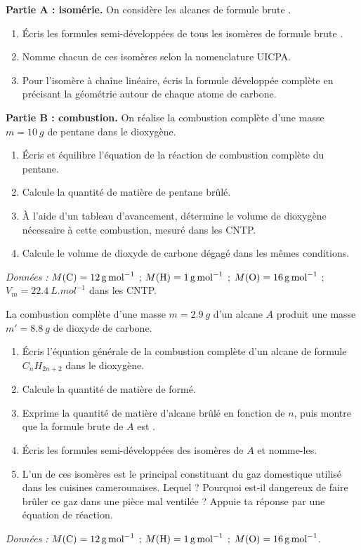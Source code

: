 \documentclass[11pt]{article}
\newcounter{popsec}
\newcounter{popsub}
\newcommand{\courssub}[1]{%
  \stepcounter{popsub}%
  \par\vspace{9pt}\noindent{\popxbold\fontsize{11.5}{13}\selectfont\color{popink}{\color{poporange}\thepopsec.\thepopsub}\hspace{6pt}#1}\par\nopagebreak\vspace{4pt}
}
\begin{document}
\courssub{Je me prépare au Probatoire}

\begin{exercice}
\textbf{Partie A : isomérie.} On considère les alcanes de formule brute .
\begin{enumerate}
\item Écris les formules semi-développées de tous les isomères de formule brute .
\item Nomme chacun de ces isomères selon la nomenclature UICPA.
\item Pour l'isomère à chaîne linéaire, écris la formule développée complète en précisant la géométrie autour de chaque atome de carbone.
\end{enumerate}
\textbf{Partie B : combustion.} On réalise la combustion complète d'une masse $m = \SI{10}{g}$ de pentane  dans le dioxygène.
\begin{enumerate}
\item Écris et équilibre l'équation de la réaction de combustion complète du pentane.
\item Calcule la quantité de matière de pentane brûlé.
\item À l'aide d'un tableau d'avancement, détermine le volume de dioxygène nécessaire à cette combustion, mesuré dans les CNTP.
\item Calcule le volume de dioxyde de carbone dégagé dans les mêmes conditions.
\end{enumerate}
\emph{Données :} $M(\ce{C}) = \SI{12}{g.mol^{-1}}$ ; $M(\ce{H}) = \SI{1}{g.mol^{-1}}$ ; $M(\ce{O}) = \SI{16}{g.mol^{-1}}$ ; $V_m = \SI{22,4}{L.mol^{-1}}$ dans les CNTP.
\end{exercice}

\begin{exercice}
La combustion complète d'une masse $m = \SI{2,9}{g}$ d'un alcane $A$ produit une masse $m' = \SI{8,8}{g}$ de dioxyde de carbone.
\begin{enumerate}
\item Écris l'équation générale de la combustion complète d'un alcane de formule $C_nH_{2n+2}$ dans le dioxygène.
\item Calcule la quantité de matière de  formé.
\item Exprime la quantité de matière d'alcane brûlé en fonction de $n$, puis montre que la formule brute de $A$ est .
\item Écris les formules semi-développées des isomères de $A$ et nomme-les.
\item L'un de ces isomères est le principal constituant du gaz domestique utilisé dans les cuisines camerounaises. Lequel ? Pourquoi est-il dangereux de faire brûler ce gaz dans une pièce mal ventilée ? Appuie ta réponse par une équation de réaction.
\end{enumerate}
\emph{Données :} $M(\ce{C}) = \SI{12}{g.mol^{-1}}$ ; $M(\ce{H}) = \SI{1}{g.mol^{-1}}$ ; $M(\ce{O}) = \SI{16}{g.mol^{-1}}$.
\end{exercice}
\end{document}
